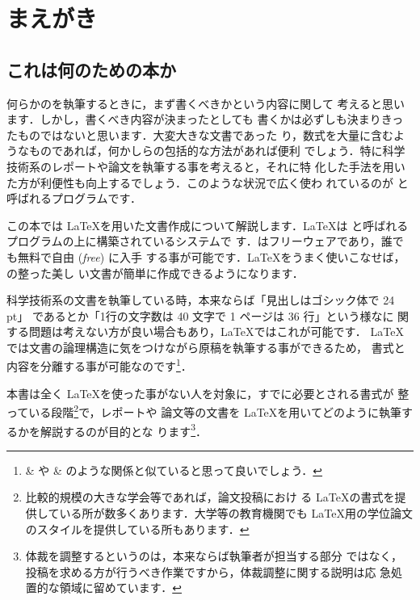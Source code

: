 \chapter{まえがき}


\newcommand*\kugiri{\bigskip}

\section*{これは何のための本か}

何らかのを執筆するときに，まず書くべきかという内容に関して
考えると思います．しかし，書くべき内容が決まったとしても
書くかは必ずしも決まりきったものではないと思います．大変大きな文書であった
り，数式を大量に含むようなものであれば，何かしらの包括的な方法があれば便利
でしょう．特に科学技術系のレポートや論文を執筆する事を考えると，それに特
化した手法を用いた方が利便性も向上するでしょう．このような状況で広く使わ
れているのが  と呼ばれるプログラムです．

この本では \LaTeX を用いた文書作成について解説します．\LaTeX は
 と呼ばれるプログラムの上に構築されているシステムで
す．\laTEX はフリーウェアであり，誰でも無料で自由 (\emph{free}) に入手
する事が可能です．\LaTeX をうまく使いこなせば，の整った美し
い文書が簡単に作成できるようになります．

科学技術系の文書を執筆している時，本来ならば「見出しはゴシック体で 24\,pt」
であるとか「1行の文字数は 40 文字で 1 ページは 36 行」という様なに
関する問題は考えない方が良い場合もあり，\LaTeX ではこれが可能です．
\LaTeX では文書の論理構造に気をつけながら原稿を執筆する事ができるため，
書式と内容を分離する事が可能なのです\footnote{ \& や
\& のような関係と似ていると思って良いでしょう．}．

本書は全く \LaTeX を使った事がない人を対象に，すでに必要とされる書式が
整っている段階\footnote{比較的規模の大きな学会等であれば，論文投稿におけ
る \LaTeX の書式を提供している所が数多くあります．大学等の教育機関でも
\LaTeX 用の学位論文のスタイルを提供している所もあります．}で，レポートや
論文等の文書を \LaTeX を用いてどのように執筆するかを解説するのが目的とな
ります\footnote{体裁を調整するというのは，本来ならば執筆者が担当する部分
ではなく，投稿を求める方が行うべき作業ですから，体裁調整に関する説明は応
急処置的な領域に留めています．}．

